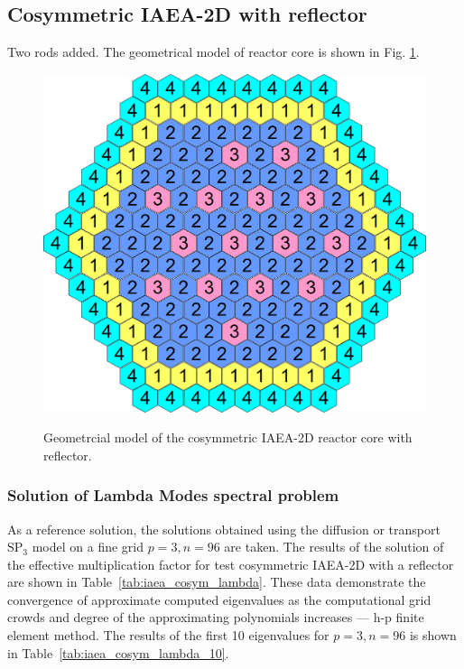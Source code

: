 \documentclass[authoryear]{elsarticle}
\begin{document}
\subsection{Cosymmetric IAEA-2D with reflector}
Two rods added.
The geometrical model of reactor core is shown in Fig. \ref{fig:iaea_cosym}. 

\begin{figure}[h]
\begin{center}
	\includegraphics[width=0.6\linewidth]{iaea_cosym.png}\\
	\caption{Geometrcial model of the cosymmetric IAEA-2D reactor core with reflector.}
	\label{fig:iaea_cosym}
\end{center}
\end{figure}

\subsubsection{Solution of Lambda Modes spectral problem}
As a reference solution, the solutions obtained using the diffusion or transport $\mathrm{SP_3}$ model on a fine grid $ p = 3, n = 96 $ are taken.
The results of the solution of the effective multiplication factor for test cosymmetric IAEA-2D with a reflector are shown in Table~\ref{tab:iaea_cosym_lambda}. 
These data demonstrate the convergence of approximate computed eigenvalues as the computational grid crowds and degree of the approximating polynomials increases --- h-p finite element method.
The results of the first 10 eigenvalues for $ p = 3, n = 96 $ is shown in Table~\ref{tab:iaea_cosym_lambda_10}.
\end{document}
